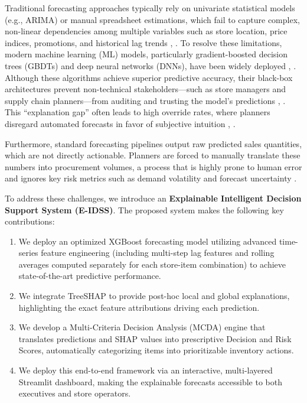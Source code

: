 \documentclass[conference]{IEEEtran}
\begin{document}
Traditional forecasting approaches typically rely on univariate statistical models (e.g., ARIMA) or manual spreadsheet estimations, which fail to capture complex, non-linear dependencies among multiple variables such as store location, price indices, promotions, and historical lag trends \cite{mustapha2025forecasting}, \cite{malik2024sales}. To resolve these limitations, modern machine learning (ML) models, particularly gradient-boosted decision trees (GBDTs) and deep neural networks (DNNs), have been widely deployed \cite{lin2026critical}, \cite{hobor2026comparative}. Although these algorithms achieve superior predictive accuracy, their black-box architectures prevent non-technical stakeholders---such as store managers and supply chain planners---from auditing and trusting the model's predictions \cite{chaganti2026advancing}, \cite{narlawar2025explainable}. This ``explanation gap'' often leads to high override rates, where planners disregard automated forecasts in favor of subjective intuition \cite{narlawar2025explainable}, \cite{chang2025explainable}.

Furthermore, standard forecasting pipelines output raw predicted sales quantities, which are not directly actionable. Planners are forced to manually translate these numbers into procurement volumes, a process that is highly prone to human error and ignores key risk metrics such as demand volatility and forecast uncertainty \cite{spanos2022application}.

To address these challenges, we introduce an \textbf{Explainable Intelligent Decision Support System (E-IDSS)}. The proposed system makes the following key contributions:
\begin{enumerate}
\item We deploy an optimized XGBoost forecasting model utilizing advanced time-series feature engineering (including multi-step lag features and rolling averages computed separately for each store-item combination) to achieve state-of-the-art predictive performance.
\item We integrate TreeSHAP to provide post-hoc local and global explanations, highlighting the exact feature attributions driving each prediction.
\item We develop a Multi-Criteria Decision Analysis (MCDA) engine that translates predictions and SHAP values into prescriptive Decision and Risk Scores, automatically categorizing items into prioritizable inventory actions.
\item We deploy this end-to-end framework via an interactive, multi-layered Streamlit dashboard, making the explainable forecasts accessible to both executives and store operators.
\end{enumerate}
\end{document}
